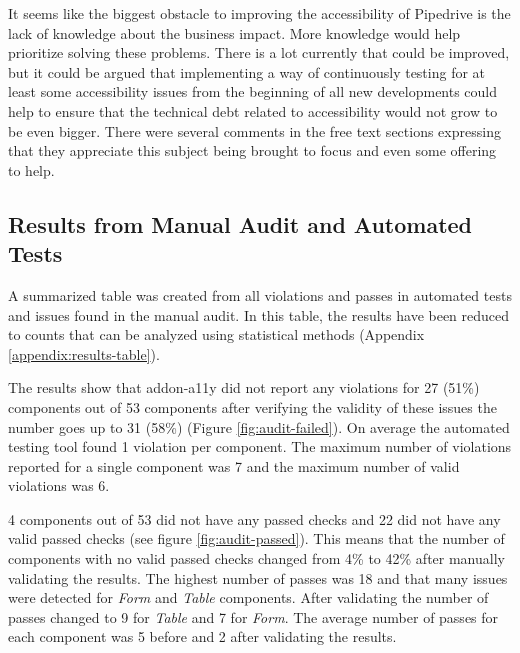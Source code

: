\documentclass{master_thesis}
\begin{document}
It seems like the biggest obstacle to improving the accessibility of Pipedrive is the lack of knowledge about the business impact. More knowledge would help prioritize solving these problems. There is a lot currently that could be improved, but it could be argued that implementing a way of continuously testing for at least some accessibility issues from the beginning of all new developments could help to ensure that the technical debt related to accessibility would not grow to be even bigger. There were several comments in the free text sections expressing that they appreciate this subject being brought to focus and even some offering to help.

\subsection{Results from Manual Audit and Automated Tests}


A summarized table was created from all violations and passes in automated tests and issues found in the manual audit. In this table, the results have been reduced to counts that can be analyzed using statistical methods (Appendix \ref{appendix:results-table}).

The results show that addon-a11y did not report any violations for 27 (51\%) components out of 53 components after verifying the validity of these issues the number goes up to 31 (58\%) (Figure \ref{fig:audit-failed}). On average the automated testing tool found 1 violation per component. The maximum number of violations reported for a single component was 7 and the maximum number of valid violations was 6.

4 components out of 53 did not have any passed checks and 22 did not have any valid passed checks (see figure \ref{fig:audit-passed}). This means that the number of components with no valid passed checks changed from 4\%  to 42\% after manually validating the results. The highest number of passes was 18 and that many issues were detected for \textit{Form} and \textit{Table} components. After validating the number of passes changed to 9 for \textit{Table} and 7 for \textit{Form}. The average number of passes for each component was 5 before and 2 after validating the results.
\end{document}
